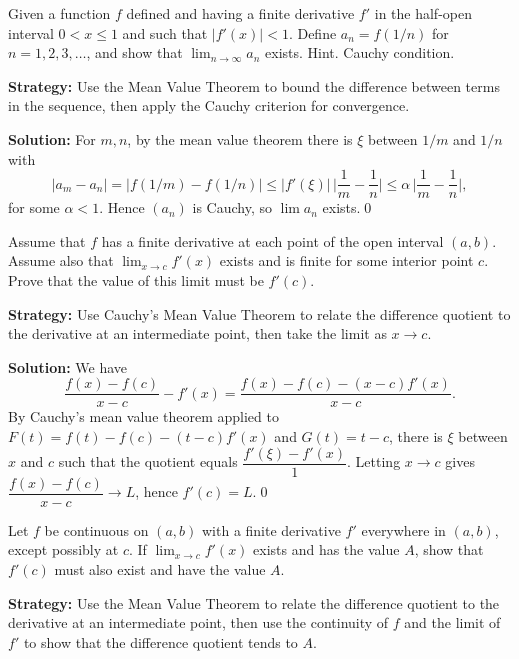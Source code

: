 \begin{problembox}
Given a function \( f \) defined and having a finite derivative \( f' \) in the half-open interval \( 0 < x \leq 1 \) and such that \( |f'(x)| < 1 \). Define \( a_n = f(1/n) \) for \( n = 1, 2, 3, \ldots \), and show that \( \lim_{n \to \infty} a_n \) exists. Hint. Cauchy condition.
\end{problembox}

\noindent\textbf{Strategy:} Use the Mean Value Theorem to bound the difference between terms in the sequence, then apply the Cauchy criterion for convergence.

\bigskip\noindent\textbf{Solution:}
For $m,n$, by the mean value theorem there is $\xi$ between $1/m$ and $1/n$ with
\[|a_m-a_n|=|f(1/m)-f(1/n)|\le |f'(\xi)|\,\Big|\frac1m-\frac1n\Big|\le \alpha\,\Big|\frac1m-\frac1n\Big|,\]
for some $\alpha<1$. Hence $(a_n)$ is Cauchy, so $\lim a_n$ exists.\qed


\begin{problembox}
Assume that \( f \) has a finite derivative at each point of the open interval \( (a, b) \). Assume also that \( \lim_{x \to c} f'(x) \) exists and is finite for some interior point \( c \). Prove that the value of this limit must be \( f'(c) \).
\end{problembox}

\noindent\textbf{Strategy:} Use Cauchy's Mean Value Theorem to relate the difference quotient to the derivative at an intermediate point, then take the limit as \( x \to c \).

\bigskip\noindent\textbf{Solution:}
We have
\[\frac{f(x)-f(c)}{x-c}-f'(x)=\frac{f(x)-f(c)-(x-c)f'(x)}{x-c}.\]
By Cauchy's mean value theorem applied to $F(t)=f(t)-f(c)-(t-c)f'(x)$ and $G(t)=t-c$, there is $\xi$ between $x$ and $c$ such that the quotient equals $\dfrac{f'(\xi)-f'(x)}{1}$. Letting $x\to c$ gives $\dfrac{f(x)-f(c)}{x-c}\to L$, hence $f'(c)=L$.\qed


\begin{problembox}
Let \( f \) be continuous on \( (a, b) \) with a finite derivative \( f' \) everywhere in \( (a, b) \), except possibly at \( c \). If \( \lim_{x \to c} f'(x) \) exists and has the value \( A \), show that \( f'(c) \) must also exist and have the value \( A \).
\end{problembox}

\noindent\textbf{Strategy:} Use the Mean Value Theorem to relate the difference quotient to the derivative at an intermediate point, then use the continuity of \( f \) and the limit of \( f' \) to show that the difference quotient tends to \( A \).

